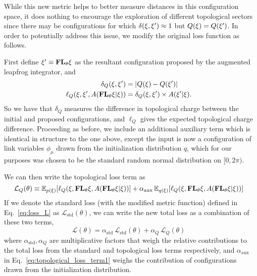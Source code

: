 \documentclass[../main.tex]{subfiles}
\begin{document}
While this new metric helps to better measure distances in this configuration space, it does nothing to encourage the
exploration of different topological sectors since there may be configurations for which $\delta(\xi, {\xi^{\prime}}) \approx 1$
but $Q(\xi) = Q({\xi^{\prime}})$.
%
In order to potentially address this issue, we modify the original loss function as follows.


First define ${\xi^{\prime}}\equiv {\mathbf{FL}_{\theta}} \xi$ as the resultant configuration proposed by the augmented leapfrog integrator, and
%
\begin{align}
  \delta_{Q}{(\xi, \xi^{\prime})} &= \left|Q{(\xi)} - Q{(\xi^{\prime})}\right| \\
  \ell_{Q}{\left(\xi, {\xi^{\prime}}, A{({\mathbf{FL}_{\theta}}\xi|\xi)}\right)} &= \delta_{Q}{(\xi,{\xi^{\prime}})}
    \times A{({\xi^{\prime}}|\xi)}.
\end{align}
%
So we have that $\delta_{Q}$ measures the difference in topological charge between the initial and proposed
configurations, and $\ell_{Q}$ gives the expected topological charge difference.
%
Proceeding as before, we include an additional auxiliary term which is identical in structure to the one above, except
the input is now a configuration of link variables $\phi_{\mu}$ drawn from the initialization distribution $q$, which
for our purposes was chosen to be the standard random normal distribution on $[0, 2\pi)$. %

We can then write the topological loss term as
%
\begin{equation}
  \mathcal{L}_{Q}(\theta) \equiv
    \mathbb{E}_{p(\xi)}{\left[\ell_{Q}{\left(\xi,
      {\mathbf{FL}_{\theta}} \xi, A{({\mathbf{FL}_{\theta}}\xi|\xi)}\right)}\right]}
      + \alpha_{\mathrm{aux}}\, \mathbb{E}_{q(\xi)}{\left[\ell_{Q}{\left(\xi,
      {\mathbf{FL}_{\theta}} \xi, A{({\mathbf{FL}_{\theta}}\xi|\xi)}\right)}\right]}
      \label{eq:topological_loss_term1}
\end{equation}
%
If we denote the standard loss (with the modified metric function) defined in Eq.~\ref{eq:loss_L} as
$\mathcal{L}_{\mathrm{std}}{(\theta)}$, we can write the new total loss as a combination of these two terms,
%
\begin{equation}
  \mathcal{L}(\theta) =
    \alpha_{\mathrm{std}}\, \mathcal{L}_{\mathrm{std}}(\theta) 
    + \alpha_{Q}\, \mathcal{L}_{Q}(\theta)
    \label{eq:topological_loss_term}
\end{equation}
%
where $\alpha_{\mathrm{std}}, \alpha_Q$ are multiplicative factors that weigh the relative contributions to the total
loss from the standard and topological loss terms respectively, and $\alpha_{\mathrm{aux}}$ in
Eq.~\ref{eq:topological_loss_term1} weighs the contribution of configurations drawn from the initialization
distribution.
%
\end{document}
